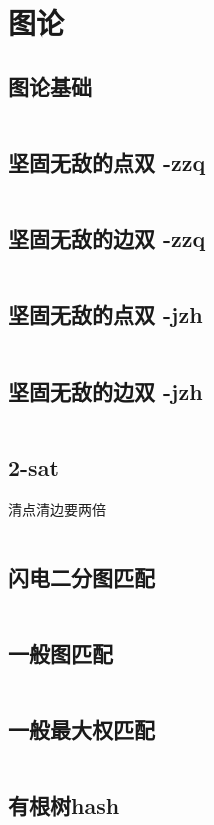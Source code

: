 \chapter{图论}
\section{图论基础}
\inputminted{cpp}{\source/graph-theory/basic.cpp}
\section{坚固无敌的点双 -zzq}
\inputminted{cpp}{\source/graph-theory/Biconnected-Point-Component -zzq.cpp}
\section{坚固无敌的边双 -zzq}
\inputminted{cpp}{\source/graph-theory/Biconnected-Edge-Component -zzq.cpp}

\section{坚固无敌的点双 -jzh}
\inputminted{cpp}{\source/graph-theory/biconnected-graph-vertex -jzh.cpp}
\section{坚固无敌的边双 -jzh}
\inputminted{cpp}{\source/graph-theory/biconnected-graph-edge -jzh.cpp}
\section{2-sat}
清点清边要两倍\inputminted{cpp}{\source/graph-theory/two-satisfiability.cpp}
\section{闪电二分图匹配}
\inputminted{cpp}{\source/graph-theory/Hopcroft-Karp.cpp}
\section{一般图匹配}
\inputminted{cpp}{\source/graph-theory/general-matching.cpp}
\section{一般最大权匹配}
\inputminted{cpp}{\source/graph-theory/weighted_blossom.cpp}
\section{有根树hash}
\inputminted{cpp}{\source/graph-theory/rooted-tree-isomorphism.cpp}
